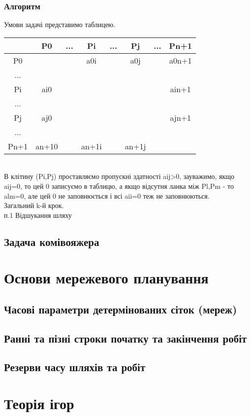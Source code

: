 \documentclass[12pt,a4paper]{book}
\begin{document}
\subsection{Алгоритм}
Умови задачі представимо таблицею.\\
\begin{tabular}{ | c | c | c | c | c | c | c | c | }
\hline
	&	P0	&	...	&	Pi	&	...	&	Pj	&	...	&	Pn+1\\
\hline
P0	&		&		&	a0i	&		&	a0j	&		&	a0n+1\\
\hline
...	&		&		&		&		&		&		&\\
\hline
Pi	&	ai0	&		&		&		&		&		&	ain+1\\
\hline
...	&		&		&		&		&		&		&\\
\hline
Pj	&	aj0	&		&		&		&		&		&	ajn+1\\
\hline
...	&		&		&		&		&		&		&\\
\hline
Pn+1	&	an+10	&		&	an+1i	&		&	an+1j	&		&\\
\hline
\end{tabular}\\
В клітину (Pi,Pj) проставляємо пропускні здатності aij>0, зауважимо, якщо aij=0, то цей 0 записуємо в таблицю, а якщо відсутня ланка між Pl,Pm - то alm=0, але цей 0 не заповнюється і всі aii=0 теж не заповнюються.\\
Загальний k-й крок.\\
п.1 Відшукання шляху 
\section{Задача комівояжера}
\chapter{Основи мережевого планування}
\section{Часові параметри детермінованих сіток (мереж)}
\section{Ранні та пізні строки початку та закінчення робіт}
\section{Резерви часу шляхів та робіт}
\chapter{Теорія ігор}
\end{document}
